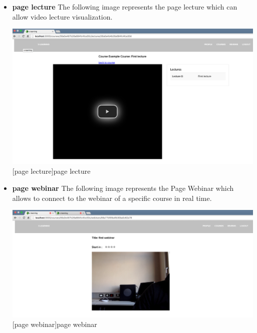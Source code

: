 \begin{itemize}
\item \textbf{page lecture} The following image represents the page lecture which can allow video lecture visualization.\par

\begin{minipage}{\linewidth}
    \centering
    \includegraphics[width=1.0\linewidth]{images/chapter4/page-lecture.png}
    [page lecture]{page lecture}
\end{minipage}


\item \textbf{page webinar} The following image represents the Page Webinar which allows to connect to the webinar of a specific course in real time.\par
\begin{minipage}{\linewidth}
    \centering
    \includegraphics[width=1.0\linewidth]{images/chapter4/page-webinar.png}
    [page webinar]{page webinar}
\end{minipage}

\end{itemize}